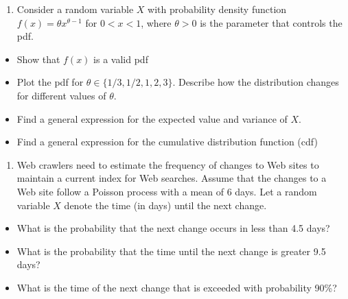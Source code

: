 \documentclass[
]{article}
\providecommand{\tightlist}{%
  \setlength{\itemsep}{0pt}\setlength{\parskip}{0pt}}
\begin{document}
\begin{enumerate}
\def\labelenumi{\arabic{enumi}.}
\setcounter{enumi}{6}
\tightlist
\item
  Consider a random variable \(X\) with probability density function
  \(f(x) = \theta x^{\theta-1}\) for \(0<x<1\), where \(\theta>0\) is
  the parameter that controls the pdf.
\end{enumerate}

\begin{itemize}
\item
  Show that \(f(x)\) is a valid pdf
\item
  Plot the pdf for \(\theta \in \{1/3,1/2,1,2,3\}\). Describe how the
  distribution changes for different values of \(\theta\).
\item
  Find a general expression for the expected value and variance of
  \(X\).
\item
  Find a general expression for the cumulative distribution function
  (cdf)
\end{itemize}

\begin{enumerate}
\def\labelenumi{\arabic{enumi}.}
\setcounter{enumi}{7}
\tightlist
\item
  Web crawlers need to estimate the frequency of changes to Web sites to
  maintain a current index for Web searches. Assume that the changes to
  a Web site follow a Poisson process with a mean of 6 days. Let a
  random variable \(X\) denote the time (in days) until the next change.
\end{enumerate}

\begin{itemize}
\item
  What is the probability that the next change occurs in less than 4.5
  days?
\item
  What is the probability that the time until the next change is greater
  9.5 days?
\item
  What is the time of the next change that is exceeded with probability
  90\%?
\end{itemize}
\end{document}
